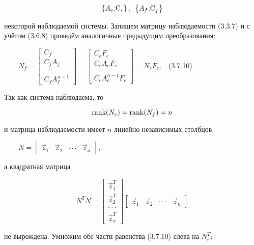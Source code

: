 \documentclass[a4paper]{article}
\newcommand\boldsubformula[1]{\text{\mathversion{bold}$#1$}}
\newcommand\normalsubformula[1]{\text{\mathversion{normal}$#1$}}
\begin{document}
\begin{equation*}
\left\{A_e\boldsubformula{\text{,C}}_e\right\},\text{   }\left\{A_f\boldsubformula{\text{,C}}_f\right\}
\end{equation*}
{\begin{russian}\sffamily
некоторой наблюдаемой системы. Запишем матрицу наблюдаемости (3.3.7) и с учётом (3.6.8) проведём аналогичные предыдущим
преобразования:
\end{russian}}

{\begin{russian}\sffamily
\ \ \ \  $N_f=\left[\begin{matrix}C_f\\C_fA_f\\\cdot \cdot \cdot
\\C_fA_f^{n-1}\end{matrix}\right]=\left[\begin{matrix}C_eF_e\\C_eA_eF_e\\\\C_eA_e^{n-1}F_e\end{matrix}\right]=N_eF_e$.\ \ (3.7.10)
\end{russian}}

{\begin{russian}\sffamily
Так как система наблюдаема, то 
\end{russian}}

\begin{equation*}
\normalsubformula{\text{rank}}(N_e)=\normalsubformula{\text{rank}}(N_f)=n
\end{equation*}
{\begin{russian}\sffamily
и матрица наблюдаемости имеет  $n$ линейно независимых столбцов
\end{russian}}

{\begin{russian}\sffamily
\ \ \ \  $N=\left[\begin{matrix}\vec z_1&\vec z_2&\cdot \cdot \cdot &\vec z_n\end{matrix}\right]$,
\end{russian}}

{\begin{russian}\sffamily
а квадратная матрица
\end{russian}}

\begin{equation*}
N^TN=\left[\begin{matrix}\vec z_1^T\\\vec z_2^T\\\cdot \cdot \cdot \\\vec
z_n^T\end{matrix}\right]\left[\begin{matrix}\vec z_1&\vec z_2&\cdot \cdot \cdot &\vec z_n\end{matrix}\right]
\end{equation*}
{\begin{russian}\sffamily
не вырождена. Умножим обе части равенства (3.7.10) слева на  $N_e^T$:
\end{russian}}
\end{document}
